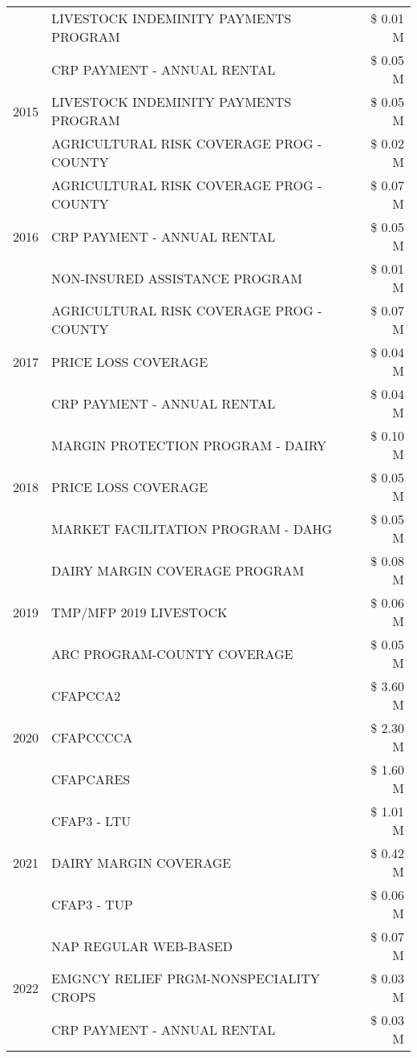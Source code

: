 \begin{tabular}{llr}
 & LIVESTOCK INDEMINITY PAYMENTS PROGRAM & \$ 0.01 M \\
\cline{1-3}
\multirow[t]{3}{*}{2015} & CRP PAYMENT - ANNUAL RENTAL & \$ 0.05 M \\
 & LIVESTOCK INDEMINITY PAYMENTS PROGRAM & \$ 0.05 M \\
 & AGRICULTURAL RISK COVERAGE PROG - COUNTY & \$ 0.02 M \\
\cline{1-3}
\multirow[t]{3}{*}{2016} & AGRICULTURAL RISK COVERAGE PROG - COUNTY & \$ 0.07 M \\
 & CRP PAYMENT - ANNUAL RENTAL & \$ 0.05 M \\
 & NON-INSURED ASSISTANCE PROGRAM & \$ 0.01 M \\
\cline{1-3}
\multirow[t]{3}{*}{2017} & AGRICULTURAL RISK COVERAGE PROG - COUNTY & \$ 0.07 M \\
 & PRICE LOSS COVERAGE & \$ 0.04 M \\
 & CRP PAYMENT - ANNUAL RENTAL & \$ 0.04 M \\
\cline{1-3}
\multirow[t]{3}{*}{2018} & MARGIN PROTECTION PROGRAM - DAIRY & \$ 0.10 M \\
 & PRICE LOSS COVERAGE & \$ 0.05 M \\
 & MARKET FACILITATION PROGRAM - DAHG & \$ 0.05 M \\
\cline{1-3}
\multirow[t]{3}{*}{2019} & DAIRY MARGIN COVERAGE PROGRAM & \$ 0.08 M \\
 & TMP/MFP 2019 LIVESTOCK & \$ 0.06 M \\
 & ARC PROGRAM-COUNTY COVERAGE & \$ 0.05 M \\
\cline{1-3}
\multirow[t]{3}{*}{2020} & CFAPCCA2 & \$ 3.60 M \\
 & CFAPCCCCA & \$ 2.30 M \\
 & CFAPCARES & \$ 1.60 M \\
\cline{1-3}
\multirow[t]{3}{*}{2021} & CFAP3 - LTU & \$ 1.01 M \\
 & DAIRY MARGIN COVERAGE & \$ 0.42 M \\
 & CFAP3 - TUP & \$ 0.06 M \\
\cline{1-3}
\multirow[t]{3}{*}{2022} & NAP REGULAR WEB-BASED & \$ 0.07 M \\
 & EMGNCY RELIEF PRGM-NONSPECIALITY CROPS & \$ 0.03 M \\
 & CRP PAYMENT - ANNUAL RENTAL & \$ 0.03 M \\
\cline{1-3}
\bottomrule
\end{tabular}
